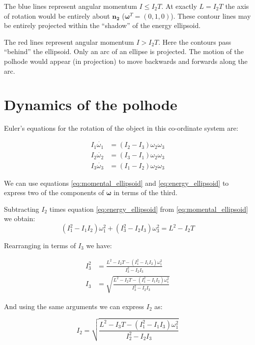 \documentclass[a4paper, 12pt]{article}
\begin{document}
The blue lines represent angular momentum $I\leq I_2T$. At exactly $L=I_2T$ the axis of rotation would be entirely about $\bm{n_2}$ ($\bm{\omega}^T=(0, 1, 0)$). These contour lines may be entirely projected within the ``shadow'' of the energy ellipsoid. 

The red lines represent angular momentum $I > I_2T$. Here the contours pass ``behind'' the ellipsoid. Only an arc of an ellipse is projected. The motion of the polhode would appear (in projection) to move backwards and forwards along the arc.

\section{Dynamics of the polhode}

Euler's equations for the rotation of the object in this co-ordinate system are:

\begin{align}
  I_1\dot{\omega_1}& =(I_2 - I_3)\omega_2\omega_3 \label{eq:euler1} \\
  I_2\dot{\omega_2}& =(I_3 - I_1)\omega_2\omega_3 \\
  I_3\dot{\omega_3}& =(I_1 - I_2)\omega_2\omega_3 
\end{align}

We can use equations \ref{eq:momental_ellipsoid} and \ref{eq:energy_ellipsoid} to express two of the components of $\boldsymbol{\omega}$ in terms of the third.

Subtracting $I_2$ times equation \ref{eq:energy_ellipsoid} from \ref{eq:momental_ellipsoid} we obtain:
\begin{equation}
  (I_1^2 - I_1I_2)\omega_1^2 + (I_3^2 - I_2I_3)\omega_3^2 = L^2 - I_2T
\end{equation}

Rearranging in terms of $I_3$ we have:

\begin{align}
  I_3^2 &=\frac{L^2 - I_2T - (I_1^2 - I_1I_2)\omega_1^2}{I_3^2 - I_2I_3} \\
  I_3 &=\sqrt{\frac{L^2 - I_2T - (I_1^2 - I_1I_2)\omega_1^2}{I_3^2 - I_2I_3}}
\end{align}

And using the same arguments we can express $I_2$ as:

\begin{equation}
  I_2 =\sqrt{\frac{L^2 - I_3T - (I_1^2 - I_1I_3)\omega_1^2}{I_2^2 - I_2I_3}}
\end{equation}
\end{document}
